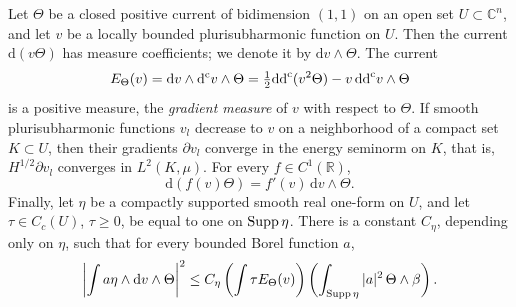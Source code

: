 \begin{lemma}\label{lem:bounded-psh-current-chain-rule}
Let $\Theta$ be a closed positive current of bidimension $(1,1)$ on an open set $U\subset\mathbb C^n$, and let $v$ be a locally bounded plurisubharmonic function on $U$. Then the current $\mathrm d(v\Theta)$ has measure coefficients; we denote it by $\mathrm dv\wedge\Theta$. The current
\begin{equation}\label{eq:bounded-current-gradient-measure}
 E_\Theta(v)=\mathrm dv\wedge\mathrm d^{\mathrm c}v\wedge\Theta
       =\tfrac12\mathrm{dd}^{\mathrm{c}}(v^2\Theta)-v\,\mathrm{dd}^{\mathrm{c}} v\wedge\Theta
\end{equation}
is a positive measure, the \emph{gradient measure} of $v$ with respect to $\Theta$. If smooth plurisubharmonic functions $v_l$ decrease to $v$ on a neighborhood of a compact set $K\subset U$, then their gradients $\partial v_l$ converge in the energy seminorm on $K$, that is, $H^{1/2}\partial v_l$ converges in $L^2(K,\mu)$. For every $f\in C^1(\mathbb R)$,
\begin{equation}\label{eq:bounded-current-chain-rule}
 \mathrm d(f(v)\Theta)=f'(v)\,\mathrm dv\wedge\Theta.
\end{equation}
Finally, let $\eta$ be a compactly supported smooth real one-form on $U$, and let $\tau\in C_c(U)$, $\tau\geq0$, be equal to one on $\operatorname{Supp}\eta$. There is a constant $C_\eta$, depending only on $\eta$, such that for every bounded Borel function $a$,
\begin{equation}\label{eq:current-gradient-cauchy-schwarz}
 \left|\int a\eta\wedge\mathrm dv\wedge\Theta\right|^2
 \leq C_\eta\left(\int\tau E_\Theta(v)\right)
                 \left(\int_{\operatorname{Supp}\eta}|a|^2\,
                                         \Theta\wedge\beta\right).
\end{equation}
\end{lemma}
